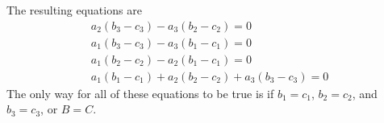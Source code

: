 The resulting equations are
\begin{gather*}
a_2(b_3 - c_3) - a_3(b_2 - c_2) = 0 \\
a_1(b_3 - c_3) - a_3(b_1 - c_1) = 0 \\
a_1(b_2 - c_2) - a_2(b_1 - c_1) = 0 \\
a_1(b_1 - c_1) + a_2(b_2 - c_2) + a_3(b_3 - c_3) = 0
\end{gather*}
The only way for all of these equations to be true is if $b_1 = c_1$, $b_2 = c_2$, and $b_3 = c_3$, or $B = C$.